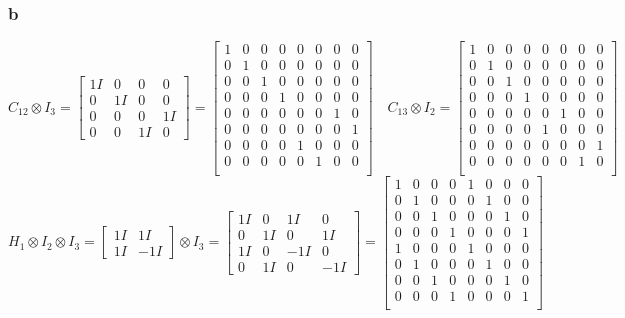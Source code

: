\documentclass{../notatki}
\begin{document}
\subsubsection{b}

$$
C_{12} \otimes I_3 =
\begin{bmatrix}
  1 I & 0 & 0 & 0 \\
  0 & 1 I & 0 & 0 \\
  0 & 0 & 0 & 1 I \\
  0 & 0 & 1 I & 0
\end{bmatrix} =
\begin{bmatrix}
  1 & 0 & 0 & 0 & 0 & 0 & 0 & 0 \\
  0 & 1 & 0 & 0 & 0 & 0 & 0 & 0 \\
  0 & 0 & 1 & 0 & 0 & 0 & 0 & 0 \\
  0 & 0 & 0 & 1 & 0 & 0 & 0 & 0 \\
  0 & 0 & 0 & 0 & 0 & 0 & 1 & 0 \\
  0 & 0 & 0 & 0 & 0 & 0 & 0 & 1 \\
  0 & 0 & 0 & 0 & 1 & 0 & 0 & 0 \\
  0 & 0 & 0 & 0 & 0 & 1 & 0 & 0 \\
\end{bmatrix}
\quad
C_{13} \otimes I_2 =
\begin{bmatrix}
  1 & 0 & 0 & 0 & 0 & 0 & 0 & 0 \\
  0 & 1 & 0 & 0 & 0 & 0 & 0 & 0 \\
  0 & 0 & 1 & 0 & 0 & 0 & 0 & 0 \\
  0 & 0 & 0 & 1 & 0 & 0 & 0 & 0 \\
  0 & 0 & 0 & 0 & 0 & 1 & 0 & 0 \\
  0 & 0 & 0 & 0 & 1 & 0 & 0 & 0 \\
  0 & 0 & 0 & 0 & 0 & 0 & 0 & 1 \\
  0 & 0 & 0 & 0 & 0 & 0 & 1 & 0 \\
\end{bmatrix}
$$
$$
H_1 \otimes I_2 \otimes I_3 =
\begin{bmatrix}
  1 I & 1 I \\
  1 I & -1 I
\end{bmatrix}
\otimes I_3 =
\begin{bmatrix}
  1 I & 0 & 1I & 0 \\
  0 & 1 I & 0 & 1I \\
  1 I & 0 & -1I & 0 \\
  0 & 1I & 0 & -1I
\end{bmatrix} =
\begin{bmatrix}
  1 & 0 & 0 & 0 & 1 & 0 & 0 & 0 \\
  0 & 1 & 0 & 0 & 0 & 1 & 0 & 0 \\
  0 & 0 & 1 & 0 & 0 & 0 & 1 & 0 \\
  0 & 0 & 0 & 1 & 0 & 0 & 0 & 1 \\
  1 & 0 & 0 & 0 & 1 & 0 & 0 & 0 \\
  0 & 1 & 0 & 0 & 0 & 1 & 0 & 0 \\
  0 & 0 & 1 & 0 & 0 & 0 & 1 & 0 \\
  0 & 0 & 0 & 1 & 0 & 0 & 0 & 1 \\
\end{bmatrix}
$$
\end{document}
